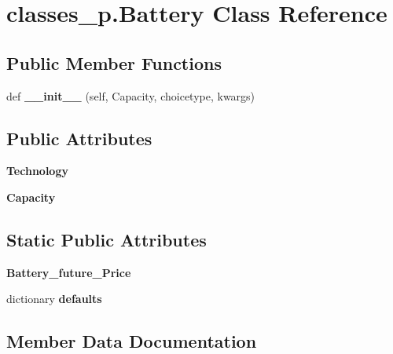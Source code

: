 \hypertarget{classclasses__p_1_1_battery}{}\section{classes\+\_\+p.\+Battery Class Reference}
\label{classclasses__p_1_1_battery}
\subsection*{Public Member Functions}
\begin{DoxyCompactItemize}
\item 
\mbox{\label{classclasses__p_1_1_battery_adba3785a8cb7037f36e7d8b10cfbcbba}} 
def {\bfseries \+\_\+\+\_\+init\+\_\+\+\_\+} (self, Capacity, choicetype, kwargs)
\end{DoxyCompactItemize}
\subsection*{Public Attributes}
\begin{DoxyCompactItemize}
\item 
\mbox{\label{classclasses__p_1_1_battery_a3c5bfb962a650ad1d4fe9d19ed525707}} 
{\bfseries Technology}
\item 
\mbox{\label{classclasses__p_1_1_battery_adbb7d66a4a3bbc88f218268538bd6684}} 
{\bfseries Capacity}
\end{DoxyCompactItemize}
\subsection*{Static Public Attributes}
\begin{DoxyCompactItemize}
\item 
\mbox{\label{classclasses__p_1_1_battery_a21683e3483638966f740b0cc0b756fb5}} 
{\bfseries Battery\+\_\+future\+\_\+\+Price}
\item 
dictionary {\bfseries defaults}
\end{DoxyCompactItemize}


\subsection{Member Data Documentation}
\mbox{\label{classclasses__p_1_1_battery_a447b8000ecd01f75f17c39f38c6600f9}} 
